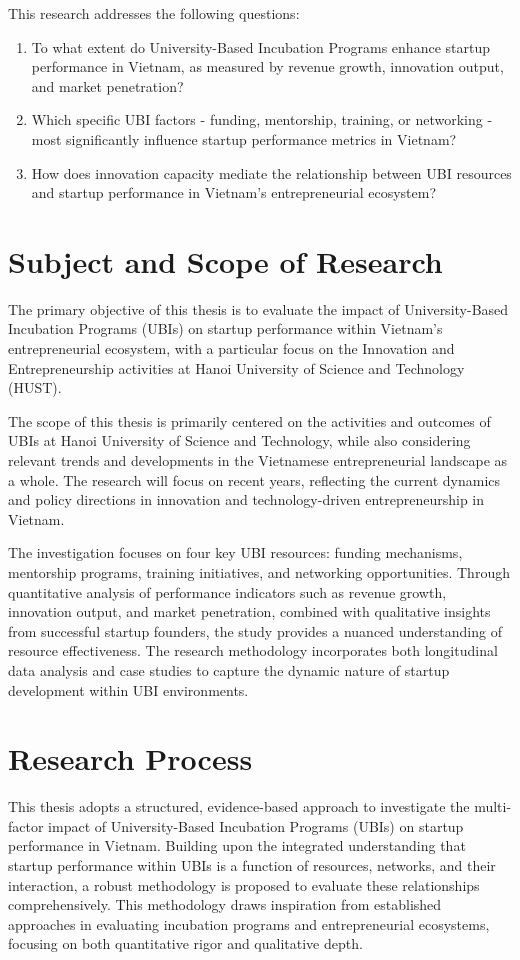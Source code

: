 \documentclass[../Main.tex]{subfiles}
\begin{document}
	This research addresses the following questions:
	\begin{enumerate}
		\item To what extent do University-Based Incubation Programs enhance startup performance in Vietnam, as measured by revenue growth, innovation output, and market penetration?
		\item Which specific UBI factors - funding, mentorship, training, or networking - most significantly influence startup performance metrics in Vietnam?
		\item How does innovation capacity mediate the relationship between UBI resources and startup performance in Vietnam's entrepreneurial ecosystem?
	\end{enumerate}

	\section{Subject and Scope of Research}
	\label{section:1.3_Subject_and_scope_of_research}
	The primary objective of this thesis is to evaluate the impact of University-Based Incubation Programs (UBIs) on startup performance within Vietnam's entrepreneurial ecosystem, with a particular focus on the Innovation and Entrepreneurship activities at Hanoi University of Science and Technology (HUST).

	The scope of this thesis is primarily centered on the activities and outcomes of UBIs at Hanoi University of Science and Technology, while also considering relevant trends and developments in the Vietnamese entrepreneurial landscape as a whole. The research will focus on recent years, reflecting the current dynamics and policy directions in innovation and technology-driven entrepreneurship in Vietnam.

	The investigation focuses on four key UBI resources: funding mechanisms, mentorship programs, training initiatives, and networking opportunities. Through quantitative analysis of performance indicators such as revenue growth, innovation output, and market penetration, combined with qualitative insights from successful startup founders, the study provides a nuanced understanding of resource effectiveness. The research methodology incorporates both longitudinal data analysis and case studies to capture the dynamic nature of startup development within UBI environments.

	\section{Research Process}
	\label{section:1.4_Research_process}
	This thesis adopts a structured, evidence-based approach to investigate the multi-factor impact of University-Based Incubation Programs (UBIs) on startup performance in Vietnam. Building upon the integrated understanding that startup performance within UBIs is a function of resources, networks, and their interaction, a robust methodology is proposed to evaluate these relationships comprehensively. This methodology draws inspiration from established approaches in evaluating incubation programs and entrepreneurial ecosystems, focusing on both quantitative rigor and qualitative depth.
\end{document}

